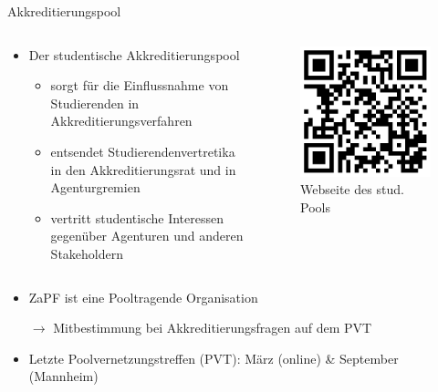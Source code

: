 \documentclass[compress, aspectratio=169]{beamer}
\begin{document}
\begin{frame}{Akkreditierungspool}
    \begin{columns}
      \begin{column}{0.85\textwidth}
        \begin{itemize}
          \item Der studentische Akkreditierungspool
          \begin{itemize}
            \item sorgt für die Einflussnahme von Studierenden in Akkreditierungsverfahren
            \item entsendet Studierendenvertretika in den Akkreditierungsrat und in Agenturgremien
            \item vertritt studentische Interessen gegenüber Agenturen und anderen Stakeholdern
          \end{itemize}
        \end{itemize}
      \end{column}
      \begin{column}{0.15\textwidth}
        \begin{figure}
          \centering
          \includegraphics[width=\textwidth]{img/pool_qrcode.png}
          \caption*{Webseite des stud. Pools}
        \end{figure}     
      \end{column}
    \end{columns}
      \begin{itemize}
        \item ZaPF ist eine Pooltragende Organisation
        \item[$\rightarrow$] Mitbestimmung bei Akkreditierungsfragen auf dem PVT
        \item Letzte Poolvernetzungstreffen (PVT): März (online) \& September (Mannheim)
      \end{itemize}
\end{frame}
\end{document}
